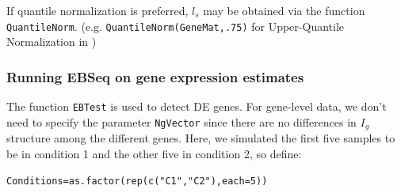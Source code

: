 \documentclass{article}
\begin{document}
\noindent If quantile normalization is preferred, $l_s$ may be obtained via the function \verb+QuantileNorm+. 
(e.g. \verb+QuantileNorm(GeneMat,.75)+ for Upper-Quantile Normalization in \cite{Bullard10})

\subsubsection{Running EBSeq on gene expression estimates}
\label{sec:startgenederun}
The function \verb+EBTest+ is used to detect DE genes. 
For gene-level data, we don't need to specify the parameter 
\verb+NgVector+ since there are no differences in $I_g$ structure among the different genes.
Here, we simulated the first five samples to be in condition 1 and the other five in condition 2, so define: 

\verb+Conditions=as.factor(rep(c("C1","C2"),each=5))+
\end{document}
